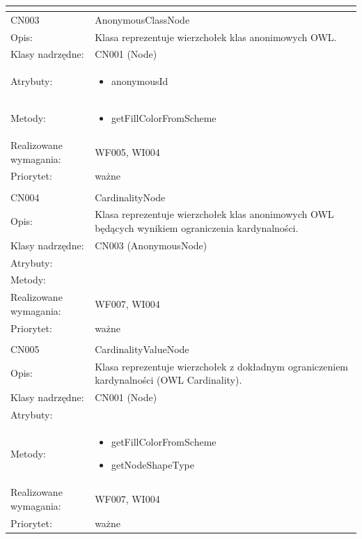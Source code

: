 \documentclass[a4paper,10pt]{article}
\begin{document}
\begin{center}
\begin{longtable}{|m{3cm}|m{9cm}|}
\multicolumn{2}{c}{} \\
 \hline

CN003 & AnonymousClassNode \\ \hline
Opis: & Klasa reprezentuje wierzchołek klas anonimowych OWL.    \\ \hline
Klasy nadrzędne: & CN001 (Node)       \\ \hline
Atrybuty: & \begin{itemize}
 \item anonymousId
\end{itemize}
 \\ \hline
Metody: & \begin{itemize}
 \item getFillColorFromScheme
\end{itemize}
  \\ \hline
Realizowane wymagania: & WF005, WI004 \\ \hline
Priorytet: & ważne \\ \hline

\multicolumn{2}{c}{} \\
 \hline

CN004 & CardinalityNode \\ \hline
Opis: & Klasa reprezentuje wierzchołek klas anonimowych OWL będących wynikiem ograniczenia kardynalności.    \\ \hline
Klasy nadrzędne: & CN003 (AnonymousNode)     \\ \hline
Atrybuty: & %
 \\ \hline
Metody: & %
  \\ \hline
Realizowane wymagania: & WF007, WI004 \\ \hline
Priorytet: & ważne  \\ \hline

\multicolumn{2}{c}{} \\
 \hline

CN005 & CardinalityValueNode \\ \hline
Opis: & Klasa reprezentuje wierzchołek z dokładnym ograniczeniem kardynalności (OWL Cardinality). \\ \hline
Klasy nadrzędne: & CN001 (Node)       \\ \hline
Atrybuty: & %
 \\ \hline
Metody: & \begin{itemize}
 \item getFillColorFromScheme
 \item getNodeShapeType
\end{itemize}
  \\ \hline
Realizowane wymagania: & WF007, WI004 \\ \hline
Priorytet: & ważne  \\ \hline


\end{longtable}
\end{center}
\end{document}

